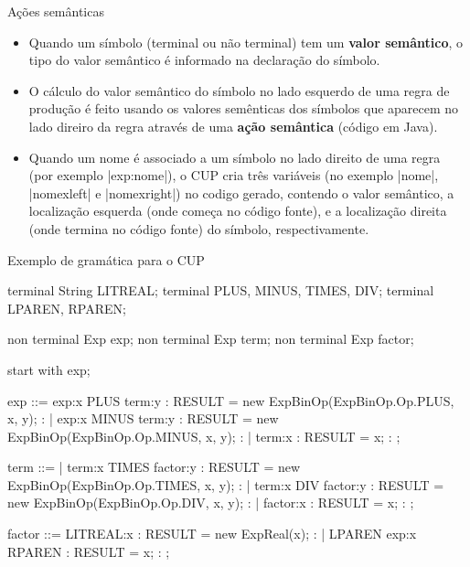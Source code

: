 \documentclass[smaller]{beamer}
\begin{document}
\begin{frame}{Ações semânticas}
  \begin{itemize}
    \item Quando um símbolo (terminal ou não terminal) tem um
    \textbf{valor semântico}, o tipo do valor semântico é informado na
    declaração do símbolo.
    \item O cálculo do valor semântico do símbolo no lado esquerdo de
    uma regra de produção é feito usando os valores semênticas dos
    símbolos que aparecem no lado direiro da regra através de uma
    \textbf{ação semântica} (código em Java).
    \item Quando um \alert{nome} é associado a um símbolo no lado
    direito de uma regra (por exemplo \pyginline|exp:nome|), o CUP
    cria três variáveis (no exemplo \pyginline|nome|,
    \pyginline|nomexleft| e \pyginline|nomexright|) no codigo gerado,
    contendo o valor semântico, a localização esquerda (onde começa no
    código fonte), e a localização direita (onde termina no código
    fonte) do símbolo, respectivamente.
  \end{itemize}
\end{frame}


\begin{frame}{Exemplo de gramática para o CUP}
  \scriptsize
\begin{pygmented}[]
terminal String LITREAL;
terminal        PLUS, MINUS, TIMES, DIV;
terminal        LPAREN, RPAREN;

non terminal Exp exp;
non terminal Exp term;
non terminal Exp factor;

start with exp;

exp ::=
  exp:x PLUS term:y      {: RESULT = new ExpBinOp(ExpBinOp.Op.PLUS, x, y);  :}
| exp:x MINUS term:y     {: RESULT = new ExpBinOp(ExpBinOp.Op.MINUS, x, y); :}
| term:x                 {: RESULT = x;                                     :}
;

term ::=
| term:x TIMES factor:y  {: RESULT = new ExpBinOp(ExpBinOp.Op.TIMES, x, y); :}
| term:x DIV factor:y    {: RESULT = new ExpBinOp(ExpBinOp.Op.DIV, x, y);   :}
| factor:x               {: RESULT = x;                                     :}
;

factor ::=
  LITREAL:x              {: RESULT = new ExpReal(x);                        :}
| LPAREN exp:x RPAREN    {: RESULT = x;                                     :}
;
\end{pygmented}
\end{frame}
\end{document}

